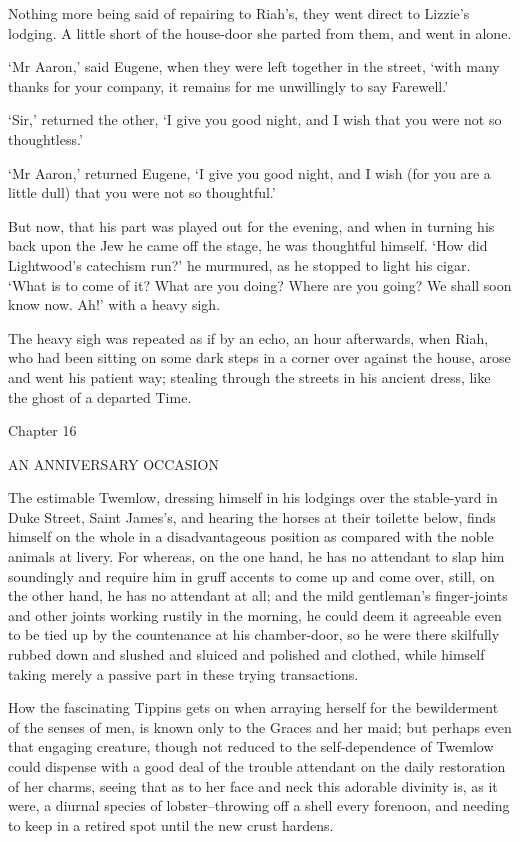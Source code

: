 Nothing more being said of repairing to Riah’s, they went direct to
Lizzie’s lodging. A little short of the house-door she parted from them,
and went in alone.

‘Mr Aaron,’ said Eugene, when they were left together in the street,
‘with many thanks for your company, it remains for me unwillingly to say
Farewell.’

‘Sir,’ returned the other, ‘I give you good night, and I wish that you
were not so thoughtless.’

‘Mr Aaron,’ returned Eugene, ‘I give you good night, and I wish (for you
are a little dull) that you were not so thoughtful.’

But now, that his part was played out for the evening, and when in
turning his back upon the Jew he came off the stage, he was thoughtful
himself. ‘How did Lightwood’s catechism run?’ he murmured, as he stopped
to light his cigar. ‘What is to come of it? What are you doing? Where
are you going? We shall soon know now. Ah!’ with a heavy sigh.

The heavy sigh was repeated as if by an echo, an hour afterwards, when
Riah, who had been sitting on some dark steps in a corner over against
the house, arose and went his patient way; stealing through the streets
in his ancient dress, like the ghost of a departed Time.



Chapter 16

AN ANNIVERSARY OCCASION


The estimable Twemlow, dressing himself in his lodgings over the
stable-yard in Duke Street, Saint James’s, and hearing the horses at
their toilette below, finds himself on the whole in a disadvantageous
position as compared with the noble animals at livery. For whereas, on
the one hand, he has no attendant to slap him soundingly and require him
in gruff accents to come up and come over, still, on the other hand,
he has no attendant at all; and the mild gentleman’s finger-joints and
other joints working rustily in the morning, he could deem it agreeable
even to be tied up by the countenance at his chamber-door, so he were
there skilfully rubbed down and slushed and sluiced and polished and
clothed, while himself taking merely a passive part in these trying
transactions.

How the fascinating Tippins gets on when arraying herself for the
bewilderment of the senses of men, is known only to the Graces and her
maid; but perhaps even that engaging creature, though not reduced to
the self-dependence of Twemlow could dispense with a good deal of the
trouble attendant on the daily restoration of her charms, seeing that
as to her face and neck this adorable divinity is, as it were, a diurnal
species of lobster--throwing off a shell every forenoon, and needing to
keep in a retired spot until the new crust hardens.

